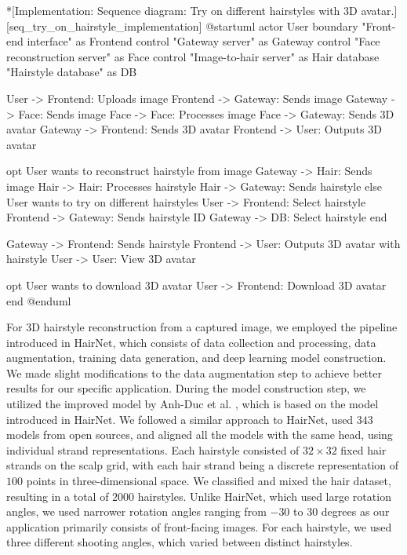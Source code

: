 \begin{umlfigure}*[Implementation: Sequence diagram: Try on different hairstyles with 3D avatar.][seq_try_on_hairstyle_implementation]
    @startuml
    actor User
    boundary "Front-end interface" as Frontend
    control "Gateway server" as Gateway
    control "Face reconstruction server" as Face
    control "Image-to-hair server" as Hair
    database "Hairstyle database" as DB

    User -> Frontend: Uploads image
    Frontend -> Gateway: Sends image
    Gateway -> Face: Sends image
    Face -> Face: Processes image
    Face -> Gateway: Sends 3D avatar
    Gateway -> Frontend: Sends 3D avatar
    Frontend -> User: Outputs 3D avatar


    opt User wants to reconstruct hairstyle from image
    Gateway -> Hair: Sends image
    Hair -> Hair: Processes hairstyle
    Hair -> Gateway: Sends hairstyle
    else User wants to try on different hairstyles
    User -> Frontend: Select hairstyle
    Frontend -> Gateway: Sends hairstyle ID
    Gateway -> DB: Select hairstyle
    end



    Gateway -> Frontend: Sends hairstyle
    Frontend -> User: Outputs 3D avatar with hairstyle
    User -> User: View 3D avatar

    opt User wants to download 3D avatar
    User -> Frontend: Download 3D avatar
    end
    @enduml
\end{umlfigure}

\clearpage


For 3D hairstyle reconstruction from a captured image, we employed the pipeline introduced in HairNet, which consists of data collection and processing, data augmentation, training data generation, and deep learning model construction. We made slight modifications to the data augmentation step to achieve better results for our specific application. During the model construction step, we utilized the improved model by Anh-Duc et al. \cite{loThreeDimensionalHairStructure2023}, which is based on the model introduced in HairNet. We followed a similar approach to HairNet, used $343$ models from open sources, and aligned all the models with the same head, using individual strand representations. Each hairstyle consisted of $32\times32$ fixed hair strands on the scalp grid, with each hair strand being a discrete representation of $100$ points in three-dimensional space. We classified and mixed the hair dataset, resulting in a total of $2000$ hairstyles. Unlike HairNet, which used large rotation angles, we used narrower rotation angles ranging from $-30$ to $30$ degrees as our application primarily consists of front-facing images. For each hairstyle, we used three different shooting angles, which varied between distinct hairstyles.


